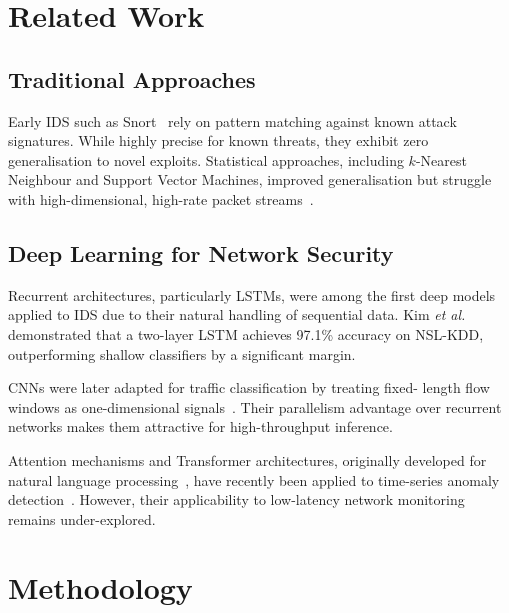 \documentclass[conference]{IEEEtran}
\begin{document}
\section{Related Work}
\label{sec:related}

\subsection{Traditional Approaches}

Early IDS such as Snort~\cite{ref:roesch1999} rely on pattern matching
against known attack signatures. While highly precise for known
threats, they exhibit zero generalisation to novel exploits. Statistical
approaches, including $k$-Nearest Neighbour and Support Vector Machines,
improved generalisation but struggle with high-dimensional, high-rate
packet streams~\cite{ref:tsai2009}.

\subsection{Deep Learning for Network Security}

Recurrent architectures, particularly LSTMs, were among the first deep
models applied to IDS due to their natural handling of sequential data.
Kim \textit{et al.}~\cite{ref:kim2016} demonstrated that a two-layer
LSTM achieves 97.1\% accuracy on NSL-KDD, outperforming shallow
classifiers by a significant margin.

CNNs were later adapted for traffic classification by treating fixed-
length flow windows as one-dimensional signals~\cite{ref:wang2017}.
Their parallelism advantage over recurrent networks makes them
attractive for high-throughput inference.

Attention mechanisms and Transformer architectures, originally
developed for natural language processing~\cite{ref:vaswani2017},
have recently been applied to time-series anomaly
detection~\cite{ref:xu2021}. However, their applicability to
low-latency network monitoring remains under-explored.

\section{Methodology}
\label{sec:method}
\end{document}
